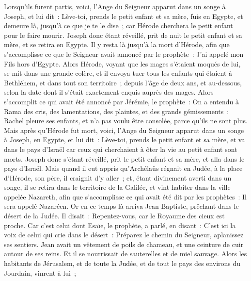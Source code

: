 \begin{multicols}{2}
Lorsqu'ils furent partis, voici, l'Ange du Seigneur apparut dans un songe à Joseph, et lui dit~: Lève-toi, prends le petit enfant et sa mère, fuis en Egypte, et demeure là, jusqu'à ce que je te le dise~; car Hérode cherchera le petit enfant pour le faire mourir.
Joseph donc étant réveillé, prit de nuit le petit enfant et sa mère, et se retira en Egypte.
Il y resta là jusqu'à la mort d'Hérode, afin que s'accomplisse ce que le Seigneur avait annoncé par le prophète~: J'ai appelé mon Fils hors d'Egypte.
Alors Hérode, voyant que les mages s'étaient moqués de lui, se mit dans une grande colère, et il envoya tuer tous les enfants qui étaient à Bethléhem, et dans tout son territoire~; depuis l'âge de deux ans, et au-dessous, selon la date dont il s'était exactement enquis auprès des mages.
Alors s'accomplit ce qui avait été annoncé par Jérémie, le prophète~:
On a entendu à Rama des cris, des lamentations, des plaintes, et des grands gémissements~: Rachel pleure ses enfants, et n'a pas voulu être consolée, parce qu'ils ne sont plus.
Mais après qu'Hérode fut mort, voici, l'Ange du Seigneur apparut dans un songe à Joseph, en Egypte,
et lui dit~: Lève-toi, prends le petit enfant et sa mère, et va dans le pays d'Israël car ceux qui cherchaient à ôter la vie au petit enfant sont morts.
Joseph donc s'étant réveillé, prit le petit enfant et sa mère, et alla dans le pays d'Israël.
Mais quand il eut appris qu'Archélaüs régnait en Judée, à la place d'Hérode, son père, il craignit d'y aller~; et, étant divinement averti dans un songe, il se retira dans le territoire de la Galilée,
et vint habiter dans la ville appelée Nazareth, afin que s'accomplisse ce qui avait été dit par les prophètes~: Il sera appelé Nazaréen.
\VerseOne{}Or en ce temps-là arriva Jean-Baptiste, prêchant dans le désert de la Judée.
Il disait~: Repentez-vous, car le Royaume des cieux est proche.
Car c'est celui dont Esaïe, le prophète, a parlé, en disant~: C'est ici la voix de celui qui crie dans le désert~: Préparez le chemin du Seigneur, aplanissez ses sentiers.
Jean avait un vêtement de poils de chameau, et une ceinture de cuir autour de ses reins. Et il se nourrissait de sauterelles et de miel sauvage.
Alors les habitants de Jérusalem, et de toute la Judée, et de tout le pays des environs du Jourdain, vinrent à lui~;

\end{multicols}
